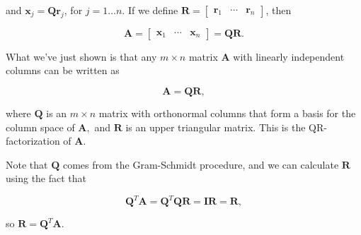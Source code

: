 \documentclass[
]{book}
\theoremstyle{definition}
\theoremstyle{definition}
\theoremstyle{definition}
\theoremstyle{definition}
\theoremstyle{remark}
\begin{document}
and \(\mathbf{x}_j=\mathbf{Q}\mathbf{r}_j\), for \(j=1\dots n\). If we define \(\mathbf{R}=\begin{bmatrix}\mathbf{r}_1 & \cdots & \mathbf{r}_n\end{bmatrix}\), then

\[\mathbf{A}=\begin{bmatrix}\mathbf{x}_1 & \cdots & \mathbf{x}_n\end{bmatrix}=\mathbf{Q}\mathbf{R}.\]

What we've just shown is that any \(m\times n\) matrix \(\mathbf{A}\) with linearly independent columns can be written as

\[\mathbf{A}=\mathbf{Q}\mathbf{R},\]

where \(\mathbf{Q}\) is an \(m\times n\) matrix with orthonormal columns that form a basis for the column space of \(\mathbf{A},\) and \(\mathbf{R}\) is an upper triangular matrix. This is the QR-factorization of \(\mathbf{A}.\)

Note that \(\mathbf{Q}\) comes from the Gram-Schmidt procedure, and we can calculate \(\mathbf{R}\) using the fact that

\[\mathbf{Q}^T\mathbf{A}=\mathbf{Q}^T\mathbf{Q}\mathbf{R}=\mathbf{I}\mathbf{R}=\mathbf{R},\]

so \(\mathbf{R}=\mathbf{Q}^T\mathbf{A}\).
\end{document}
